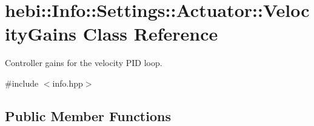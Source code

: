 \hypertarget{classhebi_1_1Info_1_1Settings_1_1Actuator_1_1VelocityGains}{}\section{hebi\+:\+:Info\+:\+:Settings\+:\+:Actuator\+:\+:Velocity\+Gains Class Reference}
\label{classhebi_1_1Info_1_1Settings_1_1Actuator_1_1VelocityGains}


Controller gains for the velocity P\+ID loop.  




{\ttfamily \#include $<$info.\+hpp$>$}

\subsection*{Public Member Functions}
